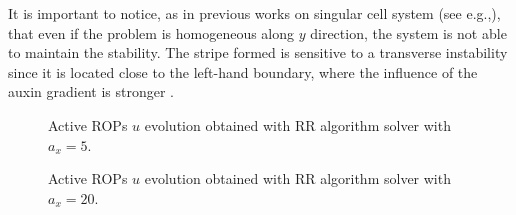 It is important to notice, as in previous works on singular cell system (see e.g.,\cite{intra2}), that even if the problem is homogeneous along $y$ direction, the system is not able to maintain the stability. The stripe formed is sensitive to a transverse instability since it is located close to the left-hand boundary, where the influence of the auxin gradient is stronger \cite{intra2}.

\begin{figure}[H]
    \centering
    \quad
    \quad
    \quad
    \caption[Tuning channel prm - $a_x = 5 $]{Active ROPs $u$ evolution obtained with RR algorithm solver with $a_x = 5 $.}
    \label{fig:a5}
\end{figure}

\begin{figure}[H]
    \centering
    \quad
    \quad
    \quad
    \caption[Tuning channel prm - $a_x = 20 $]{Active ROPs $u$ evolution obtained with RR algorithm solver with $a_x = 20 $.}
    \label{fig:a20}
\end{figure}

